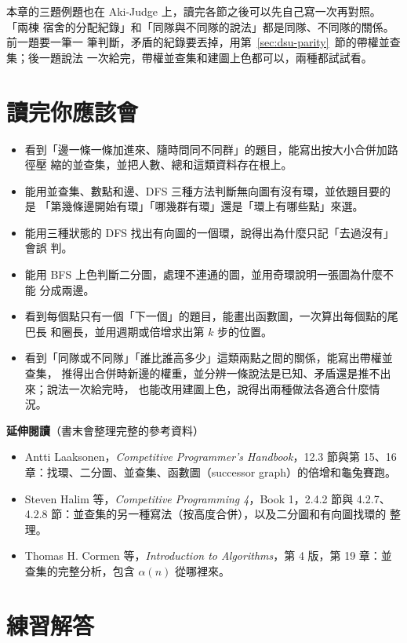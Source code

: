 本章的三題例題也在 Aki-Judge 上，讀完各節之後可以先自己寫一次再對照。 「兩棟
宿舍的分配紀錄」和「同隊與不同隊的說法」都是同隊、不同隊的關係。 前一題要一筆一
筆判斷，矛盾的紀錄要丟掉，用第~\ref{sec:dsu-parity}~節的帶權並查集；後一題說法
一次給完，帶權並查集和建圖上色都可以，兩種都試試看。

\section{讀完你應該會}
\label{sec:ch7-checklist}

\begin{itemize}
\item 看到「邊一條一條加進來、隨時問同不同群」的題目，能寫出按大小合併加路徑壓
縮的並查集，並把人數、總和這類資料存在根上。
\item 能用並查集、數點和邊、DFS 三種方法判斷無向圖有沒有環，並依題目要的是
「第幾條邊開始有環」「哪幾群有環」還是「環上有哪些點」來選。
\item 能用三種狀態的 DFS 找出有向圖的一個環，說得出為什麼只記「去過沒有」會誤
判。
\item 能用 BFS 上色判斷二分圖，處理不連通的圖，並用奇環說明一張圖為什麼不能
分成兩邊。
\item 看到每個點只有一個「下一個」的題目，能畫出函數圖，一次算出每個點的尾巴長
和圈長，並用週期或倍增求出第 $k$ 步的位置。
\item 看到「同隊或不同隊」「誰比誰高多少」這類兩點之間的關係，能寫出帶權並查集，
推得出合併時新邊的權重，並分辨一條說法是已知、矛盾還是推不出來；說法一次給完時，
也能改用建圖上色，說得出兩種做法各適合什麼情況。
\end{itemize}

\textbf{延伸閱讀}（書末會整理完整的參考資料）

\begin{itemize}
\item Antti Laaksonen，\textit{Competitive Programmer's Handbook}，12.3 節與第
15、16 章：找環、二分圖、並查集、函數圖（successor graph）的倍增和龜兔賽跑。
\item Steven Halim 等，\textit{Competitive Programming 4}，Book 1，2.4.2 節與
4.2.7、4.2.8 節：並查集的另一種寫法（按高度合併），以及二分圖和有向圖找環的
整理。
\item Thomas H. Cormen 等，\textit{Introduction to Algorithms}，第 4 版，第 19
章：並查集的完整分析，包含 $\alpha(n)$ 從哪裡來。
\end{itemize}

\section*{練習解答}

